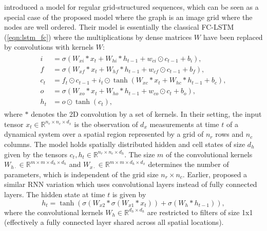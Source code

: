 \documentclass{article} %
\newcommand{\R}{\mathbb{R}}
\newcommand{\eqnref}[1]{(\ref{eqn:#1})}
\begin{document}
\citet{convlstm} introduced a model for regular grid-structured sequences, which can be
seen as a special case of the proposed model where the graph is an image grid where the
nodes are well ordered. Their model is essentially the classical FC-LSTM
\eqnref{lstm_fc} where the multiplications by dense matrices $W$ have been
replaced by convolutions with kernels $W$:
\begin{align} \label{eqn:lstm_conv}
\begin{split}
	i &= \sigma(W_{xi} \ast x_t + W_{hi} \ast h_{t-1} +
	            w_{ci} \odot c_{t-1} + b_i), \\
	f &= \sigma(W_{xf} \ast x_t + W_{hf} \ast h_{t-1} +
	            w_{cf} \odot c_{t-1} + b_f), \\
	c_t &= f_t \odot c_{t-1} + i_t \odot
	       \tanh(W_{xc} \ast x_t + W_{hc} \ast h_{t-1} + b_c), \\
	o &= \sigma(W_{xo} \ast x_t + W_{ho} \ast h_{t-1} +
	            w_{co} \odot c_t + b_o), \\
	h_t &= o \odot \tanh(c_t),
\end{split}
\end{align}
where $\ast$ denotes the 2D convolution by a set of kernels. In their setting,
the input tensor $x_t \in \R^{n_r \times n_c \times d_x}$ is the observation of
$d_x$ measurements at time $t$ of a dynamical system over a spatial region
represented by a grid of $n_r$ rows and $n_c$ columns. The model holds
spatially distributed hidden and cell states of size $d_h$ given by the tensors
$c_t, h_t \in \R^{n_r \times n_c \times d_h}$. The size $m$ of the
convolutional kernels $W_{h\cdot} \in \R^{m \times m \times d_h \times d_h}$
and $W_{x\cdot} \in \R^{m \times m \times d_h \times d_x}$ determines the
number of parameters, which is independent of the grid size $n_r \times n_c$.
Earlier, \citet{video_language_model} proposed a similar RNN variation which
uses convolutional layers instead of fully connected layers. The hidden state
at time $t$ is given by
\begin{equation}
	h_t = \tanh(\sigma(W_{x2} \ast \sigma(W_{x1} \ast x_t)) + \sigma(W_h \ast h_{t-1})),
\end{equation}
where the convolutional kernels $W_h \in \R^{d_h \times d_h}$ are restricted to
filters of size 1x1 (effectively a fully connected layer shared across all
spatial locations).
\end{document}
